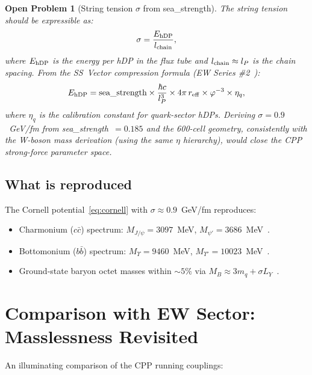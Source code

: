 \documentclass[11pt,a4paper]{article}
\newtheorem{openprob}[theorem]{Open Problem}
\newcommand{\lP}{l_P}
\newcommand{\phig}{\varphi}
\begin{document}
\begin{openprob}[String tension $\sigma$ from sea\_strength]
\label{op:sigma}
The string tension should be expressible as:
\begin{equation}
\sigma = \frac{E_{\rm hDP}}{l_{\rm chain}},
\label{eq:sigma_cpp}
\end{equation}
where $E_{\rm hDP}$ is the energy per hDP in the flux tube and
$l_{\rm chain} \approx \lP$ is the chain spacing.  From the
SS~Vector compression formula (EW Series \#2~\citep{cpp_ew2}):
\begin{equation}
E_{\rm hDP}
= \text{sea\_strength} \times \frac{\hbar c}{\lP^3}
  \times 4\pi\,r_{\rm eff} \times \phig^{-3} \times \eta_q,
\label{eq:Ehdf}
\end{equation}
where $\eta_q$ is the calibration constant for quark-sector
hDPs.  Deriving $\sigma = 0.9$~GeV/fm from sea\_strength~$=
0.185$ and the 600-cell geometry, consistently with the
W-boson mass derivation (using the same $\eta$ hierarchy),
would close the CPP strong-force parameter space.
\end{openprob}

\subsection{What is reproduced}

The Cornell potential~\eqref{eq:cornell} with
$\sigma \approx 0.9$~GeV/fm reproduces:
\begin{itemize}
\item Charmonium ($c\bar{c}$) spectrum: $M_{J/\psi} = 3097$~MeV,
  $M_{\psi'} = 3686$~MeV~\citep{pdg2026}.
\item Bottomonium ($b\bar{b}$) spectrum: $M_\Upsilon = 9460$~MeV,
  $M_{\Upsilon'} = 10023$~MeV~\citep{pdg2026}.
\item Ground-state baryon octet masses within $\sim 5\%$ via
  $M_B \approx 3m_q + \sigma L_Y$~\citep{c14}.
\end{itemize}

\section{Comparison with EW Sector: Masslessness Revisited}
\label{sec:ew_comparison}

An illuminating comparison of the CPP running couplings:
\end{document}
